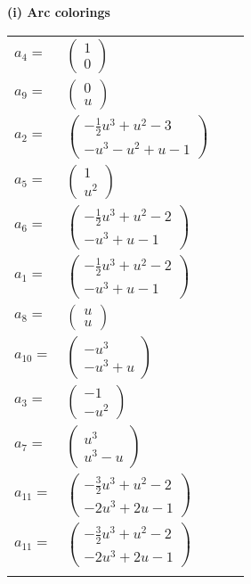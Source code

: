 \documentclass[1p]{elsarticle_modified}
\theoremstyle{definition}
\begin{document}
\flushleft \textbf{(i) Arc colorings}\\
\begin{tabular}{m{7pt} m{180pt} m{7pt} m{180pt} }
\flushright $a_{4}=$&$\begin{pmatrix}1\\0\end{pmatrix}$ \\
\flushright $a_{9}=$&$\begin{pmatrix}0\\u\end{pmatrix}$ \\
\flushright $a_{2}=$&$\begin{pmatrix}-\frac{1}{2} u^3+u^2-3\\- u^3- u^2+u-1\end{pmatrix}$ \\
\flushright $a_{5}=$&$\begin{pmatrix}1\\u^2\end{pmatrix}$ \\
\flushright $a_{6}=$&$\begin{pmatrix}-\frac{1}{2} u^3+u^2-2\\- u^3+u-1\end{pmatrix}$ \\
\flushright $a_{1}=$&$\begin{pmatrix}-\frac{1}{2} u^3+u^2-2\\- u^3+u-1\end{pmatrix}$ \\
\flushright $a_{8}=$&$\begin{pmatrix}u\\u\end{pmatrix}$ \\
\flushright $a_{10}=$&$\begin{pmatrix}- u^3\\- u^3+u\end{pmatrix}$ \\
\flushright $a_{3}=$&$\begin{pmatrix}-1\\- u^2\end{pmatrix}$ \\
\flushright $a_{7}=$&$\begin{pmatrix}u^3\\u^3- u\end{pmatrix}$ \\
\flushright $a_{11}=$&$\begin{pmatrix}-\frac{3}{2} u^3+u^2-2\\-2 u^3+2 u-1\end{pmatrix}$\\ \flushright $a_{11}=$&$\begin{pmatrix}-\frac{3}{2} u^3+u^2-2\\-2 u^3+2 u-1\end{pmatrix}$\\&\end{tabular}
\end{document}
